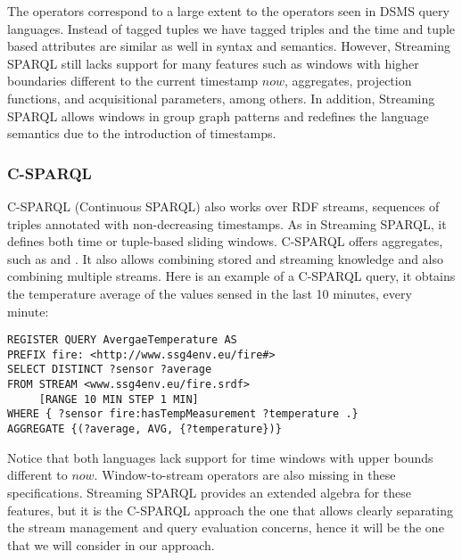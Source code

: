 The operators correspond to a large extent to the operators seen in DSMS query languages. %
Instead of tagged tuples we have tagged triples and the time and tuple based attributes are similar as well in syntax
and semantics. However, Streaming SPARQL still lacks support for many features such as windows with higher boundaries
different to the current timestamp $now$, aggregates, projection functions, and acquisitional parameters, among others.
In addition, Streaming SPARQL allows windows in group graph patterns and redefines the language semantics due to the
introduction of timestamps.

\subsubsection{C-SPARQL} C-SPARQL (Continuous SPARQL) \cite{Barbieri_2010} also works over RDF streams, sequences of triples annotated with non-decreasing timestamps. As in Streaming SPARQL, it defines both time or tuple-based sliding windows. C-SPARQL offers aggregates, such as  and . It also allows combining stored and streaming knowledge and also combining multiple streams. Here is an example of a C-SPARQL query, it obtains the temperature average of the values sensed in the last 10 minutes, every minute:

\begin{lstlisting}[style=SPARQLSTRStyle,language=SPARQLSTR,frame=none]
REGISTER QUERY AvergaeTemperature AS
PREFIX fire: <http://www.ssg4env.eu/fire#>
SELECT DISTINCT ?sensor ?average
FROM STREAM <www.ssg4env.eu/fire.srdf> 
     [RANGE 10 MIN STEP 1 MIN]
WHERE { ?sensor fire:hasTempMeasurement ?temperature .}
AGGREGATE {(?average, AVG, {?temperature})}
\end{lstlisting}

Notice that both languages lack support for time windows with upper bounds different to $now$. Window-to-stream operators are
also missing in these specifications. Streaming SPARQL provides an extended algebra for these features, but
it is the C-SPARQL approach the one that allows clearly separating the stream management and query evaluation concerns,
hence it will be the one that we will consider in our approach.
